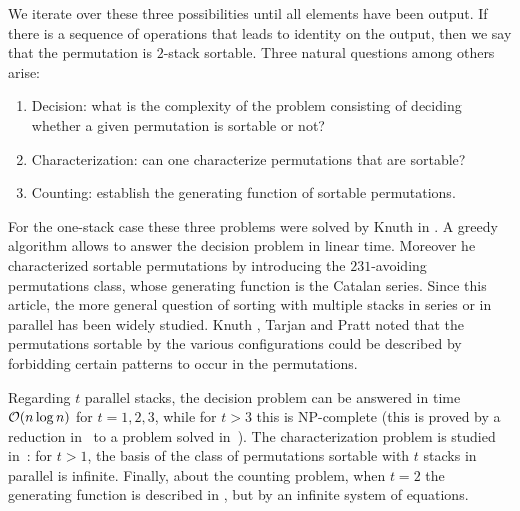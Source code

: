 \documentclass[11pt]{article}
\begin{document}
We iterate over these three possibilities until all elements have been output. 
If there is a sequence of operations that leads to identity on the output, 
then we say that the permutation is $2$-stack sortable. 
Three natural questions among others arise:
\begin{enumerate}
\item Decision: what is the complexity of the problem consisting of deciding whether a given permutation is sortable or not?
\item Characterization: can one characterize permutations that are sortable?
\item Counting: establish the generating function of sortable permutations.
\end{enumerate}

For the one-stack case these three problems were solved by Knuth in \cite{Knuth68}. 
A greedy algorithm allows to answer the decision problem in linear time. 
Moreover he characterized sortable permutations by introducing the $231$-avoiding permutations class, 
whose generating function is the Catalan series. 
Since this article, the more general question of sorting with multiple stacks in series or in parallel has been widely studied.
Knuth \cite{Knuth68}, Tarjan \cite{Tarjan72} and Pratt \cite{Pratt73} noted that the permutations sortable by the various configurations 
could be described by forbidding certain patterns to occur in the permutations.

Regarding $t$ parallel stacks,
the decision problem can be answered in time ${\cal O}(n \log n)$ for $t=1,2,3$,
while for $t>3$ this is NP-complete (this is proved by a reduction in~\cite{EvenItai71} to a problem solved in~\cite{Unger92}).
The characterization problem is studied in~\cite{Pratt73}:
for $t>1$, the basis of the class of permutations sortable with $t$ stacks in parallel is infinite.
Finally, about the counting problem,
when $t=2$ the generating function is described in \cite{ABM}, but by an infinite system of equations.
\end{document}
